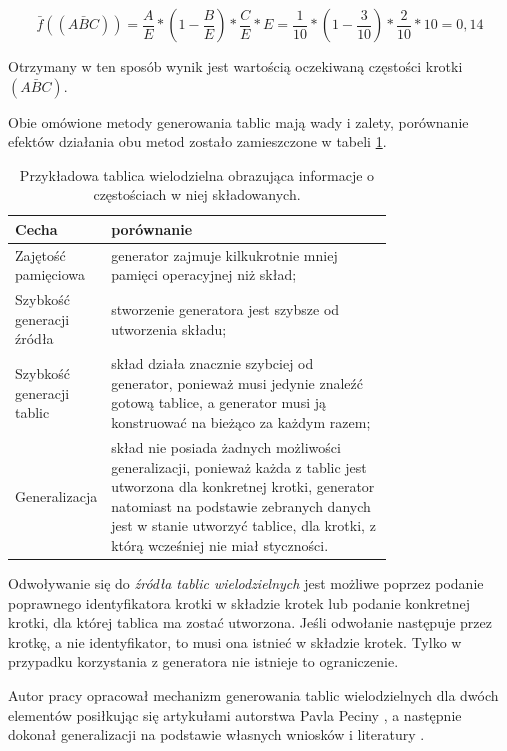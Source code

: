 $$ \bar{f}((A \bar{B} C)) = \frac{A}{E} * (1 - \frac{B}{E}) * \frac{C}{E} * E = \frac{1}{10} * (1 - \frac{3}{10}) * \frac{2}{10} * 10 = 0,14 $$

Otrzymany w ten sposób wynik jest wartością oczekiwaną częstości krotki $ (A \bar{B} C) $.

\par
Obie omówione metody generowania tablic mają wady i zalety, porównanie efektów działania obu metod zostało zamieszczone w tabeli \ref{storage_vs_generator}.
\begin{table}[h!]
\centering
\begin{tabular}{l | p{0.75\linewidth}}
	\toprule
	\textbf{Cecha}	& \textbf{porównanie}							\\
	\midrule
	Zajętość pamięciowa & generator zajmuje kilkukrotnie mniej pamięci operacyjnej niż skład;	\\
	\hline
	Szybkość generacji źródła & stworzenie generatora jest szybsze od utworzenia składu;	\\
	\hline
	Szybkość generacji tablic & skład działa znacznie szybciej od generator, ponieważ musi jedynie znaleźć gotową tablice, a generator musi ją konstruować na bieżąco za każdym razem;	\\
	\hline
	Generalizacja & skład nie posiada żadnych możliwości generalizacji, ponieważ każda z tablic jest utworzona dla konkretnej krotki, generator natomiast na podstawie zebranych danych jest w stanie utworzyć tablice, dla krotki, z którą wcześniej nie miał styczności. \\	
	\bottomrule
\end{tabular}
\caption[Tablica wielodzielna dla krotki trójelementowej]{Przykładowa tablica wielodzielna obrazująca informacje o częstościach w niej składowanych.}
\label{storage_vs_generator}
\end{table}

\par
Odwoływanie się do \emph{źródła tablic wielodzielnych} jest możliwe poprzez podanie poprawnego identyfikatora krotki w składzie krotek lub podanie konkretnej krotki, dla której tablica ma zostać utworzona.
Jeśli odwołanie następuje przez krotkę, a nie identyfikator, to musi ona istnieć w składzie krotek.
Tylko w przypadku korzystania z generatora nie istnieje to ograniczenie.

\par
Autor pracy opracował mechanizm generowania tablic wielodzielnych dla dwóch elementów posiłkując się artykułami autorstwa Pavla Peciny \cite{coling}\cite{pecina_measures}, a następnie dokonał generalizacji na podstawie własnych wniosków i literatury \cite{contingency_lecture}\cite{contingency_book}.


